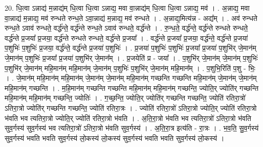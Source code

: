 \documentclass[17pt]{extarticle}
\begin{document}
20. धि॒त्वा ऽन्नाद्य॑ म॒न्नाद्य॑म् धि॒त्वा धि॒त्वा ऽन्नाद्य॒ मवा वा॒न्नाद्य॑म् धि॒त्वा धि॒त्वा ऽन्नाद्य॒ मव॑ । . अ॒न्नाद्य॒ मवा वा॒न्नाद्य॑ म॒न्नाद्य॒ मव॑ रुन्धते रुन्ध॒ते ऽवा॒न्नाद्य॑ म॒न्नाद्य॒ मव॑ रुन्धते । . अ॒न्नाद्य॒मित्य॑न्न - अद्य᳚म् । . अव॑ रुन्धते रुन्ध॒ते ऽवाव॑ रुन्धते॒ वर्द्ध॑न्ते॒ वर्द्ध॑न्ते रुन्ध॒ते ऽवाव॑ रुन्धते॒ वर्द्ध॑न्ते । . रु॒न्ध॒ते॒ वर्द्ध॑न्ते॒ वर्द्ध॑न्ते रुन्धते रुन्धते॒ वर्द्ध॑न्ते प्र॒जया᳚ प्र॒जया॒ वर्द्ध॑न्ते रुन्धते रुन्धते॒ वर्द्ध॑न्ते प्र॒जया᳚ । . वर्द्ध॑न्ते प्र॒जया᳚ प्र॒जया॒ वर्द्ध॑न्ते॒ वर्द्ध॑न्ते प्र॒जया॑ प॒शुभिः॑ प॒शुभिः॑ प्र॒जया॒ वर्द्ध॑न्ते॒ वर्द्ध॑न्ते प्र॒जया॑ प॒शुभिः॑ । . प्र॒जया॑ प॒शुभिः॑ प॒शुभिः॑ प्र॒जया᳚ प्र॒जया॑ प॒शुभि॑र् जे॒मान॑म् जे॒मान॑म् प॒शुभिः॑ प्र॒जया᳚ प्र॒जया॑ प॒शुभि॑र् जे॒मान᳚म् । . प्र॒जयेति॑ प्र - जया᳚ । . प॒शुभि॑र् जे॒मान॑म् जे॒मान॑म् प॒शुभिः॑ प॒शुभि॑र् जे॒मान॑म् महि॒मान॑म् महि॒मान॑म् जे॒मान॑म् प॒शुभिः॑ प॒शुभि॑र् जे॒मान॑म् महि॒मान᳚म् । . प॒शुभि॒रिति॑ प॒शु - भिः॒ । . जे॒मान॑म् महि॒मान॑म् महि॒मान॑म् जे॒मान॑म् जे॒मान॑म् महि॒मान॑म् गच्छन्ति गच्छन्ति महि॒मान॑म् जे॒मान॑म् जे॒मान॑म् महि॒मान॑म् गच्छन्ति । . म॒हि॒मान॑म् गच्छन्ति गच्छन्ति महि॒मान॑म् महि॒मान॑म् गच्छन्ति॒ ज्योति॒र् ज्योति॑र् गच्छन्ति महि॒मान॑म् महि॒मान॑म् गच्छन्ति॒ ज्योतिः॑ । . ग॒च्छ॒न्ति॒ ज्योति॒र् ज्योति॑र् गच्छन्ति गच्छन्ति॒ ज्योति॑ रतिरा॒त्रो॑ ऽतिरा॒त्रो ज्योति॑र् गच्छन्ति गच्छन्ति॒ ज्योति॑ रतिरा॒त्रः । . ज्योति॑ रतिरा॒त्रो॑ ऽतिरा॒त्रो ज्योति॒र् ज्योति॑ रतिरा॒त्रो भ॑वति भव त्यतिरा॒त्रो ज्योति॒र् ज्योति॑ रतिरा॒त्रो भ॑वति । . अ॒ति॒रा॒त्रो भ॑वति भव त्यतिरा॒त्रो॑ ऽतिरा॒त्रो भ॑वति सुव॒र्गस्य॑ सुव॒र्गस्य॑ भव त्यतिरा॒त्रो॑ ऽतिरा॒त्रो भ॑वति सुव॒र्गस्य॑ । . अ॒ति॒रा॒त्र इत्य॑ति - रा॒त्रः । . भ॒व॒ति॒ सु॒व॒र्गस्य॑ सुव॒र्गस्य॑ भवति भवति सुव॒र्गस्य॑ लो॒कस्य॑ लो॒कस्य॑ सुव॒र्गस्य॑ भवति भवति सुव॒र्गस्य॑ लो॒कस्य॑ । \newline
\end{document}
